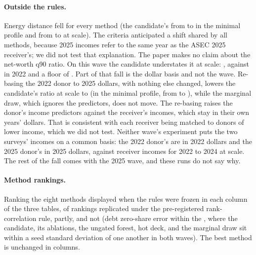 \paragraph{Outside the rules.} Energy distance fell for every method (the
candidate's from  to
 in the minimal profile and from
 to  at
scale). The criteria anticipated a shift shared by all methods, because
\scf{} 2025 incomes refer to the same year as the ASEC 2025 receiver's; we
did not test that explanation. The paper makes no claim about the net-worth
q90 ratio. On this wave the candidate understates it at scale:
, against  in
2022 and a floor of . Part of that fall is the
dollar basis and not the wave. Re-basing the 2022 donor to 2025 dollars,
with nothing else changed, lowers the candidate's ratio at scale to
 (in the minimal profile, from
 to ), while the
marginal draw, which ignores the predictors, does not move. The re-basing
raises the donor's income predictors against the receiver's incomes, which
stay in their own years' dollars. That is consistent with each receiver
being matched to donors of lower income, which we did not test. Neither wave's experiment puts the two surveys' incomes on a
common basis: the 2022 donor's are in 2022 dollars and the 2025 donor's in
2025 dollars, against receiver incomes for 2022 to 2024 at scale. The rest
of the fall comes with the 2025 wave, and these runs do not say why.

\paragraph{Method rankings.} Ranking the eight methods displayed when the
rules were frozen in each
column of the three \scf{} tables,  of
 rankings replicated under the pre-registered
rank-correlation rule,  partly, and  not
(debt zero-share error within the \scf{}, where the candidate, its
ablations, the ungated forest, hot deck, and the marginal draw sit within a
seed standard deviation of one another in both waves). The best method is unchanged in
 columns.

